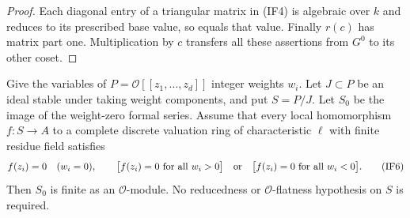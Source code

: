 \begin{proof}
Each diagonal entry of a triangular matrix in (IF4) is algebraic over
$k$ and reduces to its prescribed base value, so equals that value.
Finally $r(c)$ has matrix part one.  Multiplication by $c$ transfers
all these assertions from $G^0$ to its other coset.
\end{proof}

\begin{proposition}
\label{prop:support-integral-finiteness-criterion}
Give the variables of $P=\mathcal O[[z_1,\ldots,z_d]]$ integer
weights $w_i$.  Let $J\subset P$ be an ideal stable under taking
weight components, and put $S=P/J$.  Let $S_0$ be the image of the
weight-zero formal series.  Assume that every local homomorphism
$f:S\to A$ to a complete discrete valuation ring of characteristic
$\ell$ with finite residue field satisfies
\[
 f(z_i)=0\quad(w_i=0),\qquad
 \bigl[f(z_i)=0\text{ for all }w_i>0\bigr]\quad\hbox{or}\quad
 \bigl[f(z_i)=0\text{ for all }w_i<0\bigr].             \tag{IF6}
\]
Then $S_0$ is finite as an $\mathcal O$-module.  No reducedness or
$\mathcal O$-flatness hypothesis on $S$ is required.
\end{proposition}


